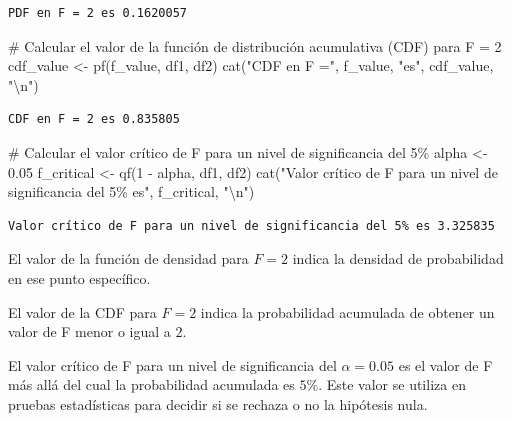 \documentclass[
  letterpaper,
  DIV=11,
  numbers=noendperiod]{scrreprt}
\newenvironment{Shaded}{\begin{snugshade}}{\end{snugshade}}
\newcommand{\CommentTok}[1]{\textcolor[rgb]{0.37,0.37,0.37}{#1}}
\newcommand{\DecValTok}[1]{\textcolor[rgb]{0.68,0.00,0.00}{#1}}
\newcommand{\FloatTok}[1]{\textcolor[rgb]{0.68,0.00,0.00}{#1}}
\newcommand{\FunctionTok}[1]{\textcolor[rgb]{0.28,0.35,0.67}{#1}}
\newcommand{\NormalTok}[1]{\textcolor[rgb]{0.00,0.23,0.31}{#1}}
\newcommand{\OtherTok}[1]{\textcolor[rgb]{0.00,0.23,0.31}{#1}}
\newcommand{\SpecialCharTok}[1]{\textcolor[rgb]{0.37,0.37,0.37}{#1}}
\newcommand{\StringTok}[1]{\textcolor[rgb]{0.13,0.47,0.30}{#1}}
\begin{document}
\begin{tcolorbox}
\begin{verbatim}
PDF en F = 2 es 0.1620057 
\end{verbatim}

\begin{Shaded}
\begin{Highlighting}[]
\CommentTok{\# Calcular el valor de la función de distribución acumulativa (CDF) para F = 2}
\NormalTok{cdf\_value }\OtherTok{\textless{}{-}} \FunctionTok{pf}\NormalTok{(f\_value, df1, df2)}
\FunctionTok{cat}\NormalTok{(}\StringTok{"CDF en F ="}\NormalTok{, f\_value, }\StringTok{"es"}\NormalTok{, cdf\_value, }\StringTok{"}\SpecialCharTok{\textbackslash{}n}\StringTok{"}\NormalTok{)}
\end{Highlighting}
\end{Shaded}

\begin{verbatim}
CDF en F = 2 es 0.835805 
\end{verbatim}

\begin{Shaded}
\begin{Highlighting}[]
\CommentTok{\# Calcular el valor crítico de F para un nivel de significancia del 5\%}
\NormalTok{alpha }\OtherTok{\textless{}{-}} \FloatTok{0.05}
\NormalTok{f\_critical }\OtherTok{\textless{}{-}} \FunctionTok{qf}\NormalTok{(}\DecValTok{1} \SpecialCharTok{{-}}\NormalTok{ alpha, df1, df2)}
\FunctionTok{cat}\NormalTok{(}\StringTok{"Valor crítico de F para un nivel de significancia del 5\% es"}\NormalTok{, f\_critical, }\StringTok{"}\SpecialCharTok{\textbackslash{}n}\StringTok{"}\NormalTok{)}
\end{Highlighting}
\end{Shaded}

\begin{verbatim}
Valor crítico de F para un nivel de significancia del 5% es 3.325835 
\end{verbatim}

El valor de la función de densidad para \(F = 2\) indica la densidad de
probabilidad en ese punto específico.

El valor de la CDF para \(F = 2\) indica la probabilidad acumulada de
obtener un valor de F menor o igual a \(2\).

El valor crítico de F para un nivel de significancia del \(\alpha=0.05\)
es el valor de F más allá del cual la probabilidad acumulada es \(5\%\).
Este valor se utiliza en pruebas estadísticas para decidir si se rechaza
o no la hipótesis nula.

\end{tcolorbox}
\end{document}

